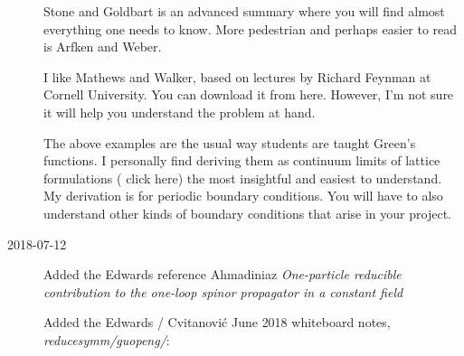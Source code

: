 \begin{description}
Stone and Goldbart is an advanced summary where you will find
almost everything one needs to know. More pedestrian and perhaps easier to
read is Arfken and Weber.

I like Mathews and Walker, based on lectures by Richard
Feynman at Cornell University. You can download it from
{here}. However, I'm not sure it will help you understand the problem at
hand.

The above examples are the usual way students are taught Green's functions. I
personally find deriving them as continuum limits of lattice formulations
(
{click here}) the most insightful and easiest to understand. My derivation
is for periodic boundary conditions. You will have to also understand other kinds of
boundary conditions that arise in your project.

\item[2018-07-12]
Added the Edwards reference
Ahmadiniaz \etal{}
{\em One-particle reducible contribution to the one-loop spinor propagator in a constant field}

Added the Edwards / Cvitanovi\'c June 2018 whiteboard notes, \emph{reducesymm/guopeng/}:


\end{description}

